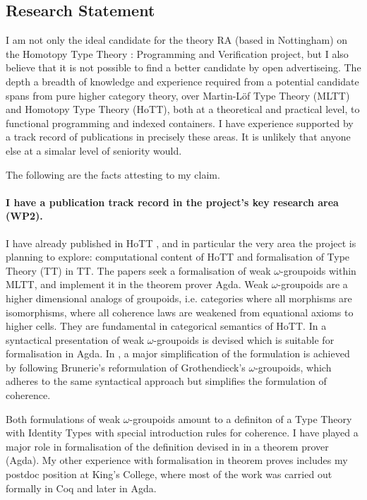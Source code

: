 \documentclass[a4paper]{article}
\newcommand{\project}{Homotopy Type Theory : Programming and Verification}
\newcommand{\mltt}{MLTT}
\begin{document}
\subsection*{Research Statement}
I am not only the ideal candidate for the theory RA (based in Nottingham) on the {\project} project, but I also believe that it is not possible to find a better candidate by open advertiseing. 
The depth a breadth of knowledge and experience required from a potential candidate spans from pure higher category theory, over Martin-L\"of Type Theory ({\mltt}) and Homotopy Type Theory (HoTT), both at a theoretical and practical level, to functional programming and indexed containers. I have experience supported by a track record of publications in precisely these areas. It is unlikely that anyone else at a simalar level of seniority would.

The following are the facts attesting to my claim. 


\paragraph{I have a publication track record in the project's key research area (WP2).}
I have already published in HoTT , and in particular the very area the project is planning to explore: computational content of HoTT and formalisation of Type Theory (TT) in TT. 
The papers seek a formalisation of weak $\omega$-groupoids within \mltt, and implement it in the theorem prover Agda. 
%
Weak $\omega$-groupoids are a higher dimensional analogs of groupoids, i.e. categories where all morphisms are isomorphisms, where all coherence laws are weakened from equational axioms to higher cells. They are fundamental in categorical semantics of HoTT.
%
In  a syntactical presentation of weak $\omega$-groupoids is devised which is suitable for formalisation in Agda. In , a major simplification of the formulation is achieved by following Brunerie's reformulation of Grothendieck's $\omega$-groupoids, which adheres to the same syntactical approach but simplifies the formulation of coherence.

Both formulations of weak $\omega$-groupoids amount to a definiton of a Type Theory with Identity Types with special introduction rules for coherence. I have played a major role in formalisation of the definition devised in  in a theorem prover (Agda). My other experience with formalisation in theorem proves includes my postdoc position at King's College, where most of the work was carried out formally in Coq and later in Agda. 
\end{document}

